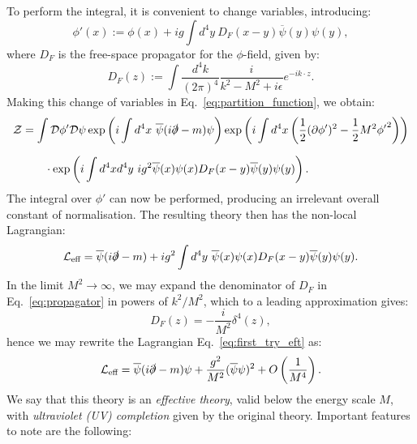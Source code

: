 \documentclass[withindex,glossary]{cam-thesis}
\begin{document}
To perform the integral, it is convenient to change variables, introducing:
\begin{equation}
\phi'(x) := \phi(x) + ig \int d^4y\ D_F(x-y)\overline{\psi}(y) \psi(y),
\end{equation}
where $D_F$ is the free-space propagator for the $\phi$-field, given by:
\begin{equation}
\label{eq:propagator}
D_F(z) := \int \frac{d^4k}{(2\pi)^4} \frac{i}{k^2 - M^2 + i\epsilon} e^{-ik \cdot z}.
\end{equation}
Making this change of variables in Eq.~\eqref{eq:partition_function}, we obtain:
\begin{align}
\mathcal{Z} &= \int \mathcal{D}\phi' \mathcal{D}\psi \exp\left(i \int d^4x\ \overline{\psi}(i \slashed{\partial} - m) \psi \right) \exp\left( i \int d^4x \left( \frac{1}{2} (\partial \phi')^2 - \frac{1}{2}M^2 {\phi'}^2\right) \right) \notag \\[1.5ex]
&\qquad \cdot \exp\left( i \int d^4x d^4y\ ig^2\overline{\psi}(x) \psi(x)D_F(x-y)\overline{\psi}(y) \psi(y) \right).
\end{align}
The integral over $\phi'$ can now be performed, producing an irrelevant overall constant of normalisation. The resulting theory then has the non-local Lagrangian:
\begin{equation}
\label{eq:first_try_eft}
\mathcal{L}_{\text{eff}} = \overline{\psi}(i \slashed{\partial} - m) + ig^2 \int d^4y\ \overline{\psi}(x) \psi(x) D_F(x-y) \overline{\psi}(y)\psi(y).
\end{equation}
In the limit $M^2 \rightarrow \infty$, we may expand the denominator of $D_F$ in Eq.~\eqref{eq:propagator} in powers of $k^2/M^2$, which to a leading approximation gives:
\begin{equation}
D_F(z) = - \frac{i}{M^2} \delta^4(z),
\end{equation}
hence we may rewrite the Lagrangian Eq.~\eqref{eq:first_try_eft} as:
\begin{equation}
\label{eq:top_down_eft}
\mathcal{L}_{\text{eff}} = \overline{\psi}(i \slashed{\partial} - m)\psi + \frac{g^2}{M^2} (\overline{\psi}\psi)^2 + O\left( \frac{1}{M^4} \right). 
\end{equation}
We say that this theory is an \textit{effective theory}, valid below the energy scale $M$, with \textit{ultraviolet (UV) completion} given by the original theory. Important features to note are the following:
\end{document}
